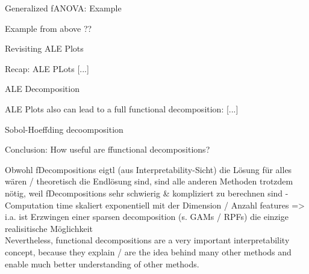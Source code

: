 \documentclass[11pt,compress,t,notes=noshow, aspectratio=169, xcolor=table]{beamer}
\begin{document}
\begin{frame}{Generalized fANOVA: Example}

    Example from above ??
    
\end{frame}

\begin{frame}{Revisiting ALE Plots}

    Recap: ALE PLots [...]
    
\end{frame}

\begin{frame}{ALE Decomposition}
    
    ALE Plots also can lead to a full functional decomposition: [...]
    
\end{frame}

\begin{frame}{Sobol-Hoeffding decoomposition}
    
\end{frame}

\begin{frame}{Conclusion: How useful are ffunctional decompositions?}

    Obwohl fDecompositions eigtl (aus Interpretability-Sicht) die Lösung für alles wären / theoretisch die Endlösung sind, sind alle anderen Methoden trotzdem nötig, weil fDecompositions sehr schwierig & kompliziert zu berechnen sind
      - Computation time skaliert exponentiell mit der Dimension / Anzahl features  =>  i.a. ist Erzwingen einer sparsen decomposition (s. GAMs / RPFs) die einzige realisitische Möglichkeit \\

    Nevertheless, functional decompositions are a very important interpretability concept, because they explain / are the idea behind many other methods and enable much better understanding of other methods.
    
\end{frame}










\endlecture
\end{document}
